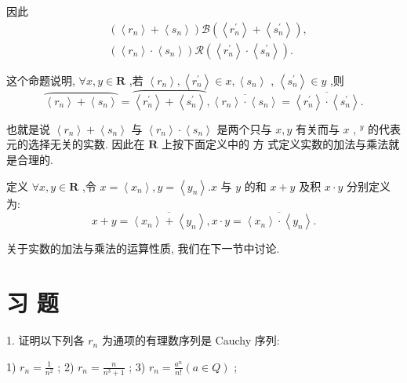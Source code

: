 因此
\begin{align*}
	&\left( {\left\langle  {r}_{n}\right\rangle   + \left\langle  {s}_{n}\right\rangle  }\right) \mathcal{B}\left( {\left\langle  {r}_{n}^{\prime }\right\rangle   + \left\langle  {s}_{n}^{\prime }\right\rangle  }\right) ,\\
	&\left( {\left\langle  {r}_{n}\right\rangle   \cdot  \left\langle  {s}_{n}\right\rangle  }\right) \mathcal{R}\left( {\left\langle  {r}_{n}^{\prime }\right\rangle   \cdot  \left\langle  {s}_{n}^{\prime }\right\rangle  }\right) .
\end{align*}

这个命题说明, $\forall x,y \in  \mathbf{R}$ ,若 $\left\langle  {r}_{n}\right\rangle  ,\left\langle  {r}_{n}^{\prime }\right\rangle   \in  x,\left\langle  {s}_{n}\right\rangle$ , $\left\langle  {s}_{n}^{\prime }\right\rangle   \in  y$ ,则
$$\overset{⏜}{\left\langle  {r}_{n}\right\rangle   + \left\langle  {s}_{n}\right\rangle  } = \overset{⏜}{\left\langle  {r}_{n}^{\prime }\right\rangle   + \left\langle  {s}_{n}^{\prime }\right\rangle  },\overline{\left\langle  {r}_{n}\right\rangle   \cdot  \left\langle  {s}_{n}\right\rangle  } = \overline{\left\langle  {r}_{n}^{\prime }\right\rangle   \cdot  \left\langle  {s}_{n}^{\prime }\right\rangle  }.$$

也就是说 $\left\langle  {r}_{n}\right\rangle   + \left\langle  {s}_{n}\right\rangle$ 与 $\left\langle  {r}_{n}\right\rangle   \cdot  \left\langle  {s}_{n}\right\rangle$ 是两个只与 $x,y$ 有关而与 $x$ , ${}^{y}$ 的代表元的选择无关的实数. 因此在 $\mathbf{R}$ 上按下面定义中的 方 式定义实数的加法与乘法就是合理的.

定义 $\forall x,y \in  \mathbf{R}$ ,令 $x = \left\langle  {x}_{n}\right\rangle  ,y = \left\langle  {y}_{n}\right\rangle  .x$ 与 $y$ 的和 $x + y$ 及积 $x \cdot  y$ 分别定义为:
$$x + y = \overline{\left\langle  {x}_{n}\right\rangle   + \left\langle  {y}_{n}\right\rangle  },x \cdot  y = \overline{\left\langle  {x}_{n}\right\rangle   \cdot  \left\langle  {y}_{n}\right\rangle  }.$$

关于实数的加法与乘法的运算性质, 我们在下一节中讨论.

\section*{习 题}

1. 证明以下列各 ${r}_{n}$ 为通项的有理数序列是 Cauchy 序列:

1) ${r}_{n} = \frac{1}{{n}^{2}}$ ; 2) ${r}_{n} = \frac{n}{{n}^{3} + 1}$ ; 3) ${r}_{n} = \frac{{a}^{n}}{n!}\left( {a \in  Q}\right)$ ;

